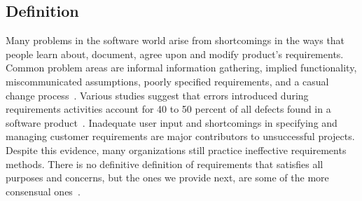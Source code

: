 \documentclass[dissertation,final]{softeng}
\begin{document}
\subsection{Definition}
Many problems in the software world arise from shortcomings in the ways that people learn about, document, agree upon and modify product's requirements. Common problem areas are informal information gathering, implied functionality, miscommunicated assumptions, poorly specified requirements, and a casual change process~\citep{Wiegers2013}. Various studies suggest that errors introduced during requirements activities account for 40 to 50 percent of all defects found in a software product~\citep{Davis200505}. Inadequate user input and shortcomings in specifying and managing customer requirements are major contributors to unsuccessful projects. Despite this evidence, many organizations still practice ineffective requirements methods. There is no definitive definition of requirements that satisfies all purposes and concerns, but the ones we provide next, are some of the more consensual ones~\citep{Wiegers2013}.
\end{document}
